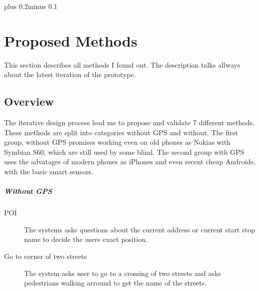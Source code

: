 \documentclass[11pt,oneside,a4paper]{book}
\begin{document}
	\mainbodystarts
	\normalfont
	\baselineskip plus 0.2\baselineskip minus 0.1\baselineskip
	
	
	
	
	
	
	\chapter{Proposed Methods}
	This section describes all methods I found out. The description talks allways about the latest iteration of the prototype.
		\section{Overview}
			The iterative design process lead me to propose and validate 7 different methods. These methods are split into categories without GPS and without. The first group, without GPS promises working even on old phones as Nokias with Symbian S60, which are still used by some blind. The second group with GPS uses the advatages of modern phones as iPhones and even recent cheap Androids, with the basic smart sensors.
			\paragraph{Without GPS}
				\begin{description}
					\item [POI]
					The systems asks questions about the current address or current start stop name to decide the users exact position.
					\item [Go to corner of two streets]
					The system asks user to go to a crossing of two streets and asks pedestrians walking arround to get the name of the streets. 
				\end{description}
\end{document}
